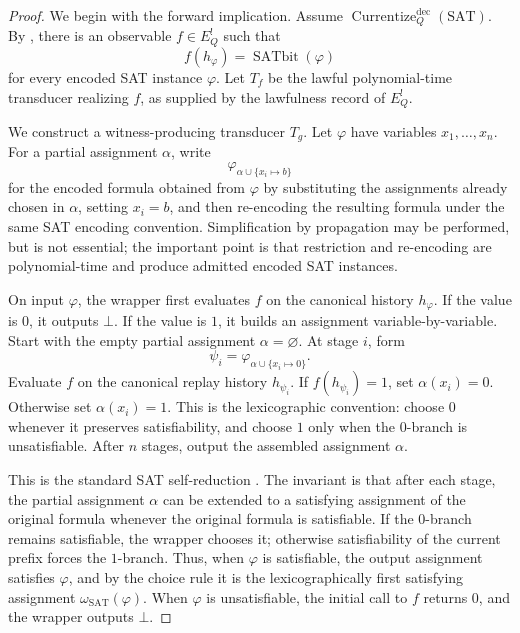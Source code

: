 \documentclass[11pt]{article}
\newcommand{\EQbang}{E^{!}_{Q}}
\newcommand{\SATbit}{\operatorname{SATbit}}
\newcommand{\omegaSATsel}{\omega_{\mathrm{SAT}}}
\newcommand{\CurrentizeDec}{\operatorname{Currentize}^{\mathrm{dec}}_{Q}}
\theoremstyle{definition}
\begin{document}
\begin{proof}
We begin with the forward implication.  Assume
\(\CurrentizeDec(\mathrm{SAT})\).  By
, there is an observable
\(f\in\EQbang\) such that
\[
  f(h_{\varphi})=\SATbit(\varphi)
\]
for every encoded SAT instance \(\varphi\).  Let \(T_{f}\) be the
lawful polynomial-time transducer realizing \(f\), as supplied by the
lawfulness record of \(\EQbang\).

We construct a witness-producing transducer \(T_{g}\).  Let
\(\varphi\) have variables \(x_{1},\ldots,x_{n}\).  For a partial
assignment \(\alpha\), write
\[
  \varphi_{\alpha\cup\{x_i\mapsto b\}}
\]
for the encoded formula obtained from \(\varphi\) by substituting the
assignments already chosen in \(\alpha\), setting \(x_i=b\), and then
re-encoding the resulting formula under the same SAT encoding
convention.  Simplification by propagation may be performed, but is
not essential; the important point is that restriction and
re-encoding are polynomial-time and produce admitted encoded SAT
instances.

On input \(\varphi\), the wrapper first evaluates \(f\) on the
canonical history \(h_{\varphi}\).  If the value is \(0\), it outputs
\(\bot\).  If the value is \(1\), it builds an assignment
variable-by-variable.  Start with the empty partial assignment
\(\alpha=\varnothing\).  At stage \(i\), form
\[
  \psi_i=\varphi_{\alpha\cup\{x_i\mapsto 0\}}.
\]
Evaluate \(f\) on the canonical replay history \(h_{\psi_i}\).  If
\(f(h_{\psi_i})=1\), set \(\alpha(x_i)=0\).  Otherwise set
\(\alpha(x_i)=1\).  This is the lexicographic convention: choose
\(0\) whenever it preserves satisfiability, and choose \(1\) only when
the \(0\)-branch is unsatisfiable.  After \(n\) stages, output the
assembled assignment \(\alpha\).

This is the standard SAT self-reduction
\citep{Schoening1986ComplexityStructure,HemaspaandraOgihara2002SelfReducibility,Selman1988SelfReducible}.
The invariant is that after each stage, the partial assignment
\(\alpha\) can be extended to a satisfying assignment of the original
formula whenever the original formula is satisfiable.  If the
\(0\)-branch remains satisfiable, the wrapper chooses it; otherwise
satisfiability of the current prefix forces the \(1\)-branch.  Thus,
when \(\varphi\) is satisfiable, the output assignment satisfies
\(\varphi\), and by the choice rule it is the lexicographically first
satisfying assignment \(\omegaSATsel(\varphi)\).  When \(\varphi\) is
unsatisfiable, the initial call to \(f\) returns \(0\), and the wrapper
outputs \(\bot\).


\end{proof}
\end{document}
